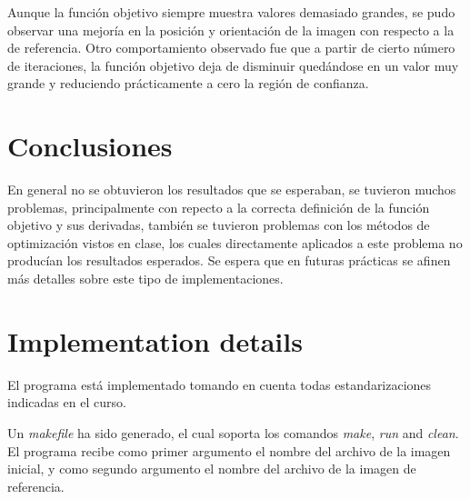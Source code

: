 \documentclass[10pt,journal,compsoc]{styles/IEEEtran}
\begin{document}
Aunque la funci\'on objetivo siempre muestra valores demasiado grandes, se pudo observar una mejor\'ia en la posici\'on y orientaci\'on de la imagen con respecto a la de referencia. Otro comportamiento observado fue que a partir de cierto n\'umero de iteraciones, la funci\'on objetivo deja de disminuir qued\'andose en un valor muy grande y reduciendo pr\'acticamente a cero la regi\'on de confianza.


\section{Conclusiones}

En general no se obtuvieron los resultados que se esperaban, se tuvieron muchos problemas, principalmente con repecto a la correcta definici\'on de la funci\'on objetivo y sus derivadas, tambi\'en se tuvieron problemas con los m\'etodos de optimizaci\'on vistos en clase, los cuales directamente aplicados a este problema no produc\'ian los resultados esperados. Se espera que en futuras pr\'acticas se afinen m\'as detalles sobre este tipo de implementaciones.





\appendix
\section{Implementation details}
El programa est\'a implementado tomando en cuenta todas estandarizaciones indicadas en el curso.

Un \textit{makefile} ha sido generado, el cual soporta los comandos \textit{make}, \textit{run} and \textit{clean}. El programa recibe como primer argumento el nombre del archivo de la imagen inicial, y como segundo argumento el nombre del archivo de la imagen de referencia.
\end{document}
